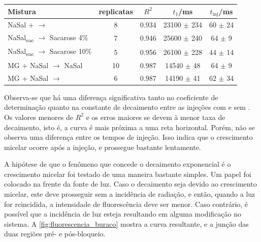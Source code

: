 	\begin{table}[h]
		{%
			\begin{tabular}{p{4cm} c c c c}
				\toprule
				Mistura                                        & replicatas & \(R^2\) & \(t_1\)/ms        & \(t_{\mathrm{inj}}\)/ms \\ \midrule
				NaSal + \agua{} \(\to\) \agua                  & 8          & 0.934   & 23100 \(\pm\) 234 & 60 \(\pm\) 24           \\
				NaSal\textsubscript{sac} \(\to\) Sacarose 4\%  & 7          & 0.946   & 25600 \(\pm\) 240 & 64 \(\pm\) 9            \\
				NaSal\textsubscript{sac} \(\to\) Sacarose 10\% & 5          & 0.956   & 26100 \(\pm\) 228 & 44 \(\pm\) 14           \\ \midrule
				MG + NaSal \(\to\) NaSal                       & 10         & 0.987   & 14540 \(\pm\) 48  & 64 \(\pm\) 9            \\
				MG + NaSal \(\to\) \agua                       & 6          & 0.987   & 14190 \(\pm\) 41  & 62 \(\pm\) 34           \\ \bottomrule
			\end{tabular}
		}{}
	\end{table} 
	
	Observa-se que há uma diferença significativa tanto no coeficiente de determinação quanto na constante de decaimento entre as injeções com e sem \TTAB{}. Os valores menores de \(R^2\) e os erros maiores se devem à menor taxa de decaimento, isto é, a curva é mais próxima a uma reta horizontal.  Porém, não se observa uma diferença entre os tempos de injeção. Isso indica que o crescimento micelar ocorre após a injeção, e prossegue bastante lentamente.
	
	A hipótese de que o fenômeno que concede o decaimento exponencial é o crescimento micelar foi testado de uma maneira bastante simples. Um papel foi colocado na frente da fonte de luz. Caso o decaimento seja devido ao crescimento micelar, este deve prosseguir sem a incidência de radiação, e então, quando a luz for reincidida, a intensidade de fluorescência deve ser menor. Caso contrário, é possível que a incidência de luz esteja resultando em alguma modificação no sistema. A \autoref{fig:fluorescencia_buraco} mostra a curva resultante, e a junção das duas regiões pré- e pós-bloqueio.
	
